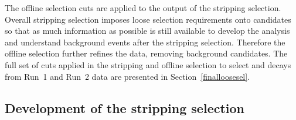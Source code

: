 
The offline selection cuts are applied to the output of the stripping selection. Overall stripping selection imposes loose selection requirements onto \bsmumu candidates so that as much information as possible is still available to develop the analysis and understand background events after the stripping selection. Therefore the offline selection further refines the data, removing background candidates. The full set of cuts applied in the stripping and offline selection to select \bsmumu and \bhh decays from Run~1 and Run~2 data are presented in Section~\ref{finalloosesel}. 


 



\subsection{Development of the stripping selection}
\label{strippingold}

